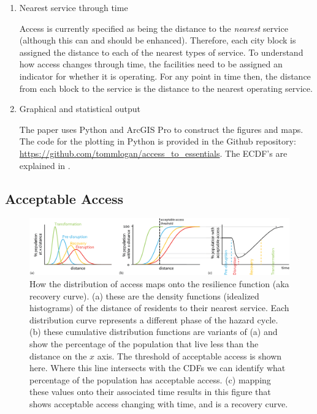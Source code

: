 \documentclass[onecolumn,doublespacing]{risa}
\let \cite \parencite
\begin{document}
\begin{enumerate}[listparindent=0em, parsep=0.5em,itemindent=0em]
    \item Nearest service through time
    
    Access is currently specified as being the distance to the \textit{nearest} service (although this can and should be enhanced). 
    Therefore, each city block is assigned the distance to each of the nearest types of service.
    To understand how access changes through time, the facilities need to be assigned an indicator for whether it is operating.
    For any point in time then, the distance from each block to the service is the distance to the nearest operating service.
    
    \item Graphical and statistical output
    
    The paper uses Python and ArcGIS Pro to construct the figures and maps. 
    The code for the plotting in Python is provided in the Github repository: \url{https://github.com/tommlogan/access_to_essentials}.
    The ECDF's are explained in \cite{Logan2017-fr}.
    
\end{enumerate}

\clearpage
\subsection{Acceptable Access}

\begin{figure}[h]
    \centering
    \includegraphics[width=\linewidth]{report/fig/dist_to_resil.png}
    \caption{
    How the distribution of access maps onto the resilience function (aka recovery curve). (a) these are the density functions (idealized histograms) of the distance of residents to their nearest service.
    Each distribution curve represents a different phase of the hazard cycle. 
    (b) these cumulative distribution functions are variants of (a) and show the percentage of the population that live less than the distance on the $x$ axis.
    The threshold of acceptable access is shown here. Where this line intersects with the CDFs we can identify what percentage of the population has acceptable access.
    (c) mapping these values onto their associated time results in this figure that shows acceptable access changing with time, and is a recovery curve.
    }
    \label{figS:cdf_to_res}
\end{figure}
\end{document}
